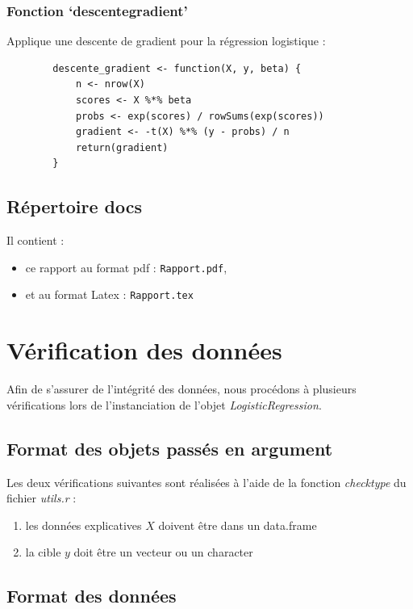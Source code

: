 \documentclass[10pt,french]{report}
\begin{document}
	\subsubsection{Fonction \enquote*{descente\textunderscore gradient}}

	Applique une descente de gradient pour la régression logistique :
	\begin{verbatim}
		descente_gradient <- function(X, y, beta) {
			n <- nrow(X)
			scores <- X %*% beta
			probs <- exp(scores) / rowSums(exp(scores))
			gradient <- -t(X) %*% (y - probs) / n
			return(gradient)
		}
	\end{verbatim}

	\subsection{Répertoire docs}

	Il contient :
	\begin{itemize}
		\item ce rapport au format pdf : \texttt{Rapport.pdf},
		\item et au format Latex : \texttt{Rapport.tex}
	\end{itemize}

	\section{Vérification des données}
	Afin de s'assurer de l'intégrité des données, nous procédons à plusieurs vérifications lors de l'instanciation de l'objet \textit{LogisticRegression}.

	\subsection{Format des objets passés en argument}

	Les deux vérifications suivantes sont réalisées à l'aide de la fonction \textit{check\textunderscore type} du fichier \textit{utils.r} :

	\begin{enumerate}
		\item les données explicatives $X$ doivent être dans un data.frame
		\item la cible $y$ doit être un vecteur ou un character
	\end{enumerate}

	\subsection{Format des données}
\end{document}
